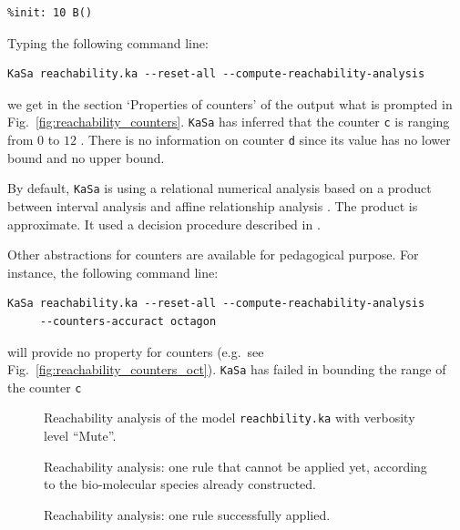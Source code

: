 \documentclass[11pt]{book}
\def\ttt#1{\texttt{#1}}
\def\eg{e.g.~}
\begin{document}
\begin{itemize}
\begin{lstlisting}[language=kappa]
%init:	10	A()
%init: 10 B()
\end{lstlisting}

Typing the following command line:
\begin{verbatim}
KaSa reachability.ka --reset-all --compute-reachability-analysis
\end{verbatim}
we get in the section `Properties of counters' of the output what is prompted  in Fig.~\ref{fig:reachability_counters}. \ttt{KaSa} has inferred that the counter \texttt{c} is ranging from $0$ to $12$
. There is no information on counter \texttt{d} since its value has no lower bound and no upper bound.

By default, \ttt{KaSa} is using a relational numerical analysis based on a product between interval analysis \cite{CousotCousot76-1} and affine relationship analysis \cite{karr}. The product is approximate. It used a decision procedure described in \cite{feret:occurrence-counting}.

Other abstractions for counters are available for pedagogical purpose. For instance, the following command line:
\begin{verbatim}
KaSa reachability.ka --reset-all --compute-reachability-analysis
     --counters-accuract octagon
\end{verbatim}
will provide no property for counters (\eg see Fig.~\ref{fig:reachability_counters_oct}). \ttt{KaSa} has failed in bounding the range of the counter \texttt{c}
\end{itemize}




\begin{figure}[htbp]

\caption{Reachability analysis of the model \texttt{reachbility.ka} with verbosity level ``Mute''.}
\label{fig:reachability_mute}
\end{figure}
%
\begin{figure}[htbp]

\caption{Reachability analysis: one rule that cannot be applied yet, according to the bio-molecular species already constructed.}
\label{fig:reachability_medium_ko}
\end{figure}

\begin{figure}[htbp]

\caption{Reachability analysis: one rule successfully applied.}
\label{fig:reachability_medium_ok}
\end{figure}
\end{document}
